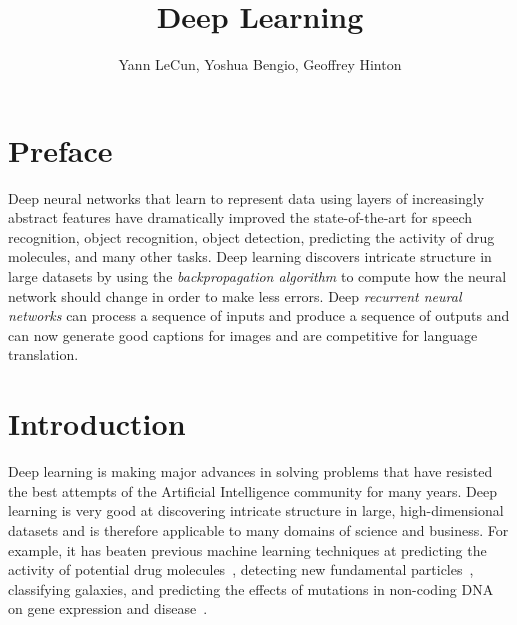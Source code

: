 \documentclass[10pts]{article}
\title{Deep Learning}
\author{Yann LeCun, Yoshua Bengio, Geoffrey Hinton}
\begin{document}
\maketitle

\section{Preface}

Deep neural networks that learn to represent data using layers of
increasingly abstract features have dramatically improved the
state-of-the-art for speech recognition, object recognition, object
detection, predicting the activity of drug molecules, and many other
tasks. Deep learning discovers intricate structure in large datasets by
using the {\em backpropagation algorithm} to compute how the neural network
should change in order to make less errors.  Deep {\em recurrent neural
  networks} can process a sequence of inputs and produce a sequence of
outputs and can now generate good captions for images and are competitive
for language translation.

\section{Introduction}

Deep learning is making major advances in solving problems
that have resisted the best attempts of the Artificial Intelligence
community for many years. Deep learning is very good at discovering
intricate structure in large, high-dimensional datasets and is
therefore applicable to many domains of science and business. For
example, it has beaten previous machine learning techniques at
predicting the activity of potential drug
molecules~\citep{Dahl-et-al-arxiv2014}, detecting new fundamental
particles~\citep{Melis-Higgs-boson-competition-2014}, %
classifying galaxies, %
and predicting the effects of mutations
in non-coding DNA on gene expression and
disease~\citep{Keung-et-al-2014}. %
\end{document}
